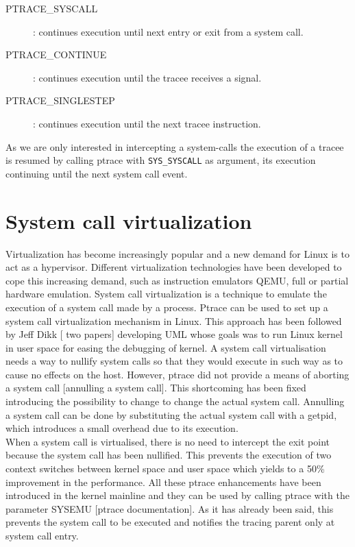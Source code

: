 \begin{description}
\item[PTRACE\_SYSCALL] :
	continues execution until next entry or exit from a system call.
\item[PTRACE\_CONTINUE]:
	 continues execution until the tracee receives a signal.
\item[PTRACE\_SINGLESTEP] :
	continues execution until the next tracee instruction. 
\end{description}

As we are only interested in intercepting a system-calls the execution of a tracee is resumed by calling ptrace with \lstinline$SYS_SYSCALL$ as argument, its execution continuing until the next system call event. 


\section{System call virtualization}
\label{system_call_virtualization}
Virtualization has become increasingly popular and a new demand for Linux is to act as a hypervisor. Different virtualization technologies have been developed to cope this increasing demand, such as instruction emulators QEMU, full or partial hardware emulation.  
System call virtualization is a technique to emulate the execution of a system call made by a process.
Ptrace can be used to set up a system call virtualization mechanism in Linux. This approach has been followed by Jeff Dikk [ two papers]  developing UML whose goals was to run Linux kernel in user space for easing the debugging of kernel.
A system call virtualisation needs a way to nullify system calls so that they would execute in such way as to cause no effects on the host.  However, ptrace did not provide a means of aborting a system call [annulling a system call].  This shortcoming has been fixed introducing the possibility to change to change the actual system call. Annulling a system call can be done by substituting the actual system call with a getpid, which introduces a small overhead due to its execution. \\
When a system call is virtualised, there is no need to intercept the exit point because the system call has been nullified.  This prevents the execution of two context switches between kernel space and user space which yields to a 50\% improvement in the performance.  All these ptrace enhancements have been introduced in the kernel mainline and they can be used by calling ptrace with the parameter SYSEMU [ptrace documentation]. As it has already been said, this prevents the system call to be executed and notifies the tracing parent only at system call entry.  \\
